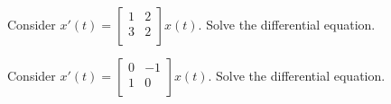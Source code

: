 \documentclass[12pt,letterpaper]{article}
\begin{document}
\newpage


\begin{enumerate}

\Problem Consider $x'(t) = \begin{bmatrix} 1 & 2\\ 3 & 2\\ \end{bmatrix} x(t)$. Solve the differential equation.

\vfill

\Problem Consider $x'(t) = \begin{bmatrix} 0 & -1\\ 1 & 0\\ \end{bmatrix} x(t)$. Solve the differential equation.

\vfill


\newpage


\end{enumerate}

\newpage
{}%
\lhead{}
\rhead{}
\thispagestyle{fancy}
\end{document}
